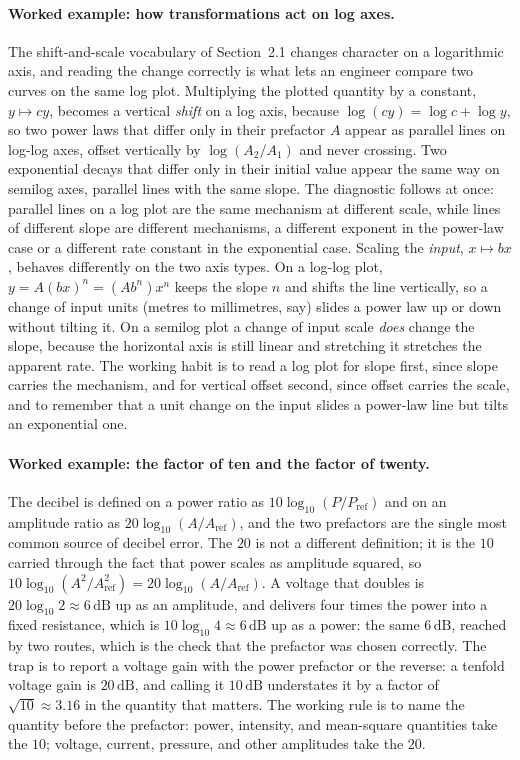 \paragraph{Worked example: how transformations act on log axes.}
The shift-and-scale vocabulary of Section~2.1 changes character on a
logarithmic axis, and reading the change correctly is what lets an
engineer compare two curves on the same log plot. Multiplying the
plotted quantity by a constant, $y \mapsto c y$, becomes a vertical
\emph{shift} on a log axis, because $\log(c y) = \log c + \log y$, so
two power laws that differ only in their prefactor $A$ appear as
parallel lines on log-log axes, offset vertically by $\log(A_{2}/
A_{1})$ and never crossing. Two exponential decays that differ only in
their initial value appear the same way on semilog axes, parallel
lines with the same slope. The diagnostic follows at once: parallel
lines on a log plot are the same mechanism at different scale, while
lines of different slope are different mechanisms, a different exponent
in the power-law case or a different rate constant in the exponential
case. Scaling the \emph{input}, $x \mapsto bx$, behaves differently on
the two axis types. On a log-log plot, $y = A(bx)^{n} = (A b^{n})
x^{n}$ keeps the slope $n$ and shifts the line vertically, so a change
of input units (metres to millimetres, say) slides a power law up or
down without tilting it. On a semilog plot a change of input scale
\emph{does} change the slope, because the horizontal axis is still
linear and stretching it stretches the apparent rate. The working
habit is to read a log plot for slope first, since slope carries the
mechanism, and for vertical offset second, since offset carries the
scale, and to remember that a unit change on the input slides a
power-law line but tilts an exponential one.

\paragraph{Worked example: the factor of ten and the factor of twenty.}
The decibel is defined on a power ratio as $10\log_{10}(P/P_{\text{ref}})$
and on an amplitude ratio as $20\log_{10}(A/A_{\text{ref}})$, and the
two prefactors are the single most common source of decibel error. The
$20$ is not a different definition; it is the $10$ carried through the
fact that power scales as amplitude squared, so
$10\log_{10}(A^2/A_{\text{ref}}^2) = 20\log_{10}(A/A_{\text{ref}})$. A
voltage that doubles is $20\log_{10} 2 \approx 6\,\si{\deci\bel}$ up as
an amplitude, and delivers four times the power into a fixed resistance,
which is $10\log_{10} 4 \approx 6\,\si{\deci\bel}$ up as a power: the
same $6\,\si{\deci\bel}$, reached by two routes, which is the check that
the prefactor was chosen correctly. The trap is to report a voltage
gain with the power prefactor or the reverse: a tenfold voltage gain is
$20\,\si{\deci\bel}$, and calling it $10\,\si{\deci\bel}$ understates it
by a factor of $\sqrt{10} \approx 3.16$ in the quantity that matters.
The working rule is to name the quantity before the prefactor: power,
intensity, and mean-square quantities take the $10$; voltage, current,
pressure, and other amplitudes take the $20$.

